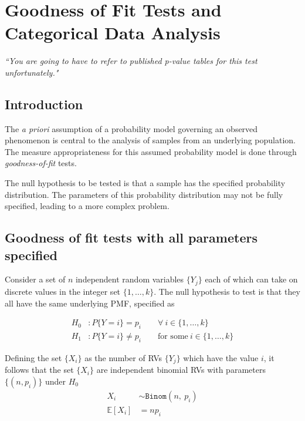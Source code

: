 \chapter{Goodness of Fit Tests and Categorical Data Analysis}


\begin{flushright}
	\textit{``You are going to have to refer to published p-value tables for this test unfortunately."}
\end{flushright}

\section{Introduction}

The \textit{a priori} assumption of a probability model governing an observed phenomenon is central to the analysis of samples from an underlying population. The measure appropriateness for this assumed probability model is done through \textit{goodness-of-fit} tests.

The null hypothesis to be tested is that a sample has the specified probability distribution. The parameters of this probability distribution may not be fully specified, leading to a more complex problem.

\section{Goodness of fit tests with all parameters specified}

Consider a set of $ n $ independent random variables $ \{Y_j\} $ each of which can take on discrete values in the integer set $ \{1, \dots , k\} $. The null hypothesis to test is that they all have the same underlying PMF, specified as

\begin{align}
	H_0 &: P\{Y = i\} = p_i \qquad \forall \ i \in \{1, \dots , k\} \\
	H_1 &: P\{Y = i\} \neq p_i \qquad \text{for some}\  i \in \{1, \dots , k\} \nonumber
\end{align}

Defining the set $ \{X_i\} $ as the number of RVs $ \{Y_j\} $ which have the value $ i $, it follows that the set $ \{X_i\} $ are independent binomial RVs with parameters $ \{(n, p_i)\} $ under $ H_0 $\\

\begin{align}
	X_i &\sim \texttt{Binom} (n,\ p_i) \\
	\mathbb{E}[X_i] &= np_i
\end{align}

